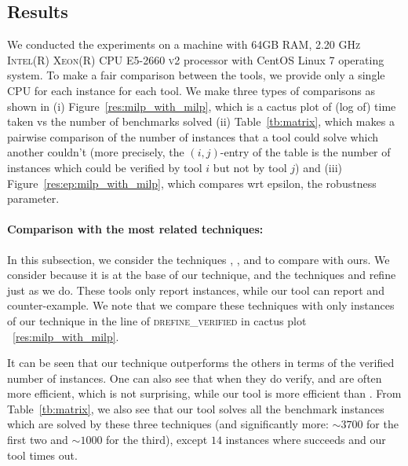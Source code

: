 \subsection{Results}
We conducted the experiments on a machine with \textsc{64GB RAM, 2.20 GHz Intel(R) Xeon(R) CPU E5-2660 v2}
processor with CentOS Linux 7 operating system. 
To make a fair comparison between the tools, we provide only a single \textsc{CPU} for each instance for each tool. 
We make three types of comparisons as shown in (i) Figure~\ref{res:milp_with_milp}, which is a cactus plot of (log of) time taken vs the number of benchmarks solved (ii) Table~\ref{tb:matrix}, which makes a pairwise comparison of the number of instances that a tool could solve which another couldn't  (more precisely, the $(i,j)$-entry of the table is the number of instances which could be verified by tool $i$ but not by tool $j$) and (iii) Figure~\ref{res:ep:milp_with_milp}, which compares wrt epsilon, the robustness parameter.

\paragraph{Comparison with the most related techniques:}
In this subsection, we consider the techniques \deeppoly{}, \kpoly{}, and \deepsrgr{} to compare with ours. 
We consider \deeppoly{} because it is at the base of our technique, and the techniques \kpoly{} and \deepsrgr{} refine \deeppoly{} just as we do. These tools only report \verified{} instances, while our tool can report  \verified{} and counter-example. We note that we compare these techniques with only \verified{}  instances of our technique in the line of \textsc{drefine\_verified} in cactus plot ~\ref{res:milp_with_milp}. 

It can be seen that our technique outperforms the others in terms of the verified number of instances. One can also see that when they do verify, \deeppoly{} and \kpoly{} are often more efficient, which is not surprising, while our tool is more efficient than \deepsrgr{}. From Table~\ref{tb:matrix}, we also see  that our tool solves all the benchmark instances which are solved by these three techniques (and significantly more: $\sim 3700$ for the first two and $\sim 1000$ for the third), except $14$ instances where \kpoly{} succeeds and our tool times out.

